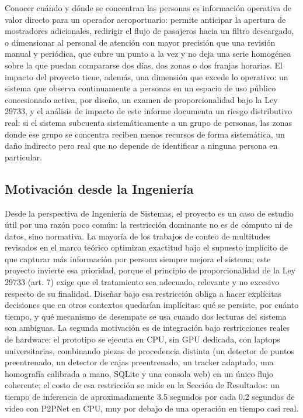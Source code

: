 Conocer cuándo y dónde se concentran las personas es información operativa de valor
directo para un operador aeroportuario: permite anticipar la apertura de mostradores
adicionales, redirigir el flujo de pasajeros hacia un filtro descargado, o dimensionar al personal
de atención con mayor precisión que una revisión manual y periódica, que cubre un punto a la
vez y no deja una serie homogénea sobre la que puedan compararse dos días, dos zonas o dos
franjas horarias. El impacto del proyecto tiene, además, una dimensión que excede lo
operativo: un sistema que observa continuamente a personas en un espacio de uso público
concesionado activa, por diseño, un examen de proporcionalidad bajo la Ley 29733, y el
análisis de impacto de este informe documenta un riesgo distributivo real: si el sistema
subcuenta sistemáticamente a un grupo de personas, las zonas donde ese grupo se concentra
reciben menos recursos de forma sistemática, un daño indirecto pero real que no depende de
identificar a ninguna persona en particular.

\subsection{Motivación desde la Ingeniería}
\label{subsec:motivacion-ingenieria}

Desde la perspectiva de Ingeniería de Sistemas, el proyecto es un caso de estudio útil por
una razón poco común: la restricción dominante no es de cómputo ni de datos, sino normativa.
La mayoría de los trabajos de conteo de multitudes revisados en el marco teórico optimizan
exactitud bajo el supuesto implícito de que capturar más información por persona siempre
mejora el sistema; este proyecto invierte esa prioridad, porque el principio de proporcionalidad
de la Ley 29733 (art. 7) exige que el tratamiento sea adecuado, relevante y no excesivo respecto
de su finalidad. Diseñar bajo esa restricción obliga a hacer explícitas decisiones que en otros
contextos quedarían implícitas: qué se persiste, por cuánto tiempo, y qué mecanismo de
desempate se usa cuando dos lecturas del sistema son ambiguas. La segunda motivación es de
integración bajo restricciones reales de hardware: el prototipo se ejecuta en CPU, sin GPU
dedicada, con laptops universitarias, combinando piezas de procedencia distinta (un detector de
puntos preentrenado, un detector de cajas preentrenado, un tracker adaptado, una homografía
calibrada a mano, SQLite y una consola web) en un único flujo coherente; el costo de esa
restricción se mide en la Sección de Resultados: un tiempo de inferencia de aproximadamente
3.5 segundos por cada 0.2 segundos de video con P2PNet en CPU, muy por debajo de una
operación en tiempo casi real.

